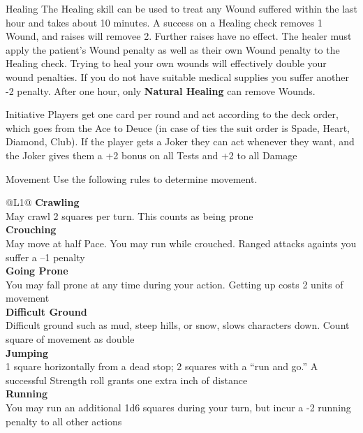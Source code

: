 \begin{genericsection}{Healing}
The Healing skill can be used to treat any Wound suffered within the last hour and takes about 10 minutes. A success on a Healing check removes 1 Wound, and raises will removee 2. Further raises have no effect. The healer must apply the patient's Wound penalty as well as their own Wound penalty to the Healing check. Trying to heal your own wounds will effectively double your wound penalties. If you do not have suitable medical supplies you suffer another -2 penalty. After one hour, only \textbf{Natural Healing} can remove Wounds.
\end{genericsection}

\begin{genericsection}{Initiative}
Players get one card per round and act according to the deck order, which goes from the Ace to Deuce (in case of ties the suit order is Spade, Heart, Diamond, Club). If the player gets a Joker they can act whenever they want, and the Joker gives them a +2 bonus on all Tests and +2 to all Damage
\end{genericsection}

\begin{genericsection}{Movement} 
Use the following rules to determine movement.
\begin{redtable}{\linewidth}{@{}L{1}@{}}
  \textbf{Crawling}\\
  May crawl 2 squares per turn. This counts as being prone\\
  \textbf{Crouching}\\
  May move at half Pace. You may run while crouched. Ranged attacks againts you suffer a –1 penalty\\
  \textbf{Going Prone}\\
  You may fall prone at any time during your action. Getting up costs 2 units of movement\\
  \textbf{Difficult Ground}\\
  Difficult ground such as mud, steep hills, or snow, slows characters down. Count square of movement as double\\
  \textbf{Jumping}\\
  1 square horizontally from a dead stop; 2 squares with a “run and go.” A successful Strength roll grants one extra inch of distance\\
  \textbf{Running}\\
  You may run an additional 1d6 squares during your turn, but incur a -2 running penalty to all other actions\\
\end{redtable}
\end{genericsection}

